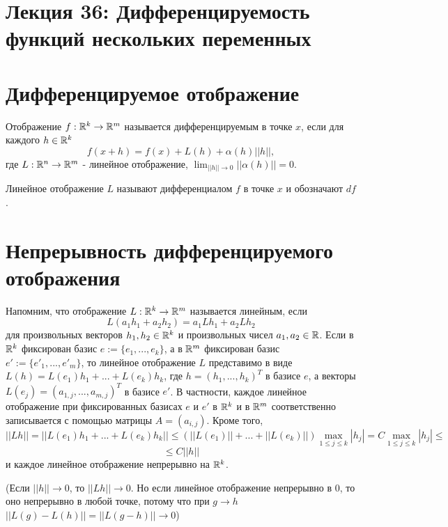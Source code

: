     \section*{Лекция 36: Дифференцируемость функций нескольких переменных}
    
    \section{Дифференцируемое отображение}
    
    \begin{definition}
    	Отображение $f : \mathbb R^k \rightarrow \mathbb R^m$ называется  дифференцируемым в точке $x$, если для каждого $h \in \mathbb R^k$
    	\[ f(x + h) = f(x) + L(h) + \alpha(h) ||h||, \]
    	где $L: \mathbb R^n \rightarrow \mathbb R^m$ - линейное отображение, $\displaystyle \lim_{||h|| \rightarrow 0} ||\alpha(h)|| = 0$.
    	
    	Линейное отображение $L$ называют дифференциалом $f$ в точке $x$ и обозначают $df$.
    \end{definition}
    
    \section{Непрерывность дифференцируемого отображения}
    
    \begin{mention}
    	Напомним, что отображение $L: \mathbb R^k \rightarrow \mathbb R^m$ называется линейным, если
    	\[ L(a_1 h_1 + a_2 h_2) = a_1 Lh_1 + a_2Lh_2 \]    	
    	для произвольных векторов $h_1, h_2 \in \mathbb R^k$ и произвольных чисел $a_1, a_2 \in \mathbb R$. Если в $\mathbb R^k$ фиксирован базис $e := \{e_1, ..., e_k\}$, а в $\mathbb R^m$ фиксирован базис $e' := \{e'_1, ..., e'_m\}$, то линейное отображение $L$ представимо в виде $L(h) = L(e_1)h_1 + ... + L(e_k)h_k$, где $h = (h_1, ..., h_k)^T$ в базисе $e$, а векторы $L(e_j) = (a_{1, j}, ..., a_{m, j})^T$ в базисе $e'$. В частности, каждое линейное отображение при фиксированных базисах $e$ и $e'$ в $\mathbb R^k$ и в $\mathbb R^m$ соответственно записывается с помощью матрицы $A = (a_{i, j})$. Кроме того,
    	\[ ||Lh|| = ||L(e_1)h_1 + ... + L(e_k)h_k|| \leqslant (||L(e_1)|| + ... + ||L(e_k)||) \max_{1 \leqslant j \leqslant k} |h_j| = C \max_{1 \leqslant j \leqslant k} |h_j| \leqslant \]
    	\[ \leqslant C ||h|| \]
    	и каждое линейное отображение непрерывно на $\mathbb R^k$.
    	
    	(Если $||h|| \to 0$, то $||Lh|| \to 0$. Но если линейное отображение непрерывно в 0, то оно непрерывно в любой точке, потому что при $g \to h$ $||L(g) - L(h)|| = ||L(g - h)|| \to 0$)
    \end{mention}
    
